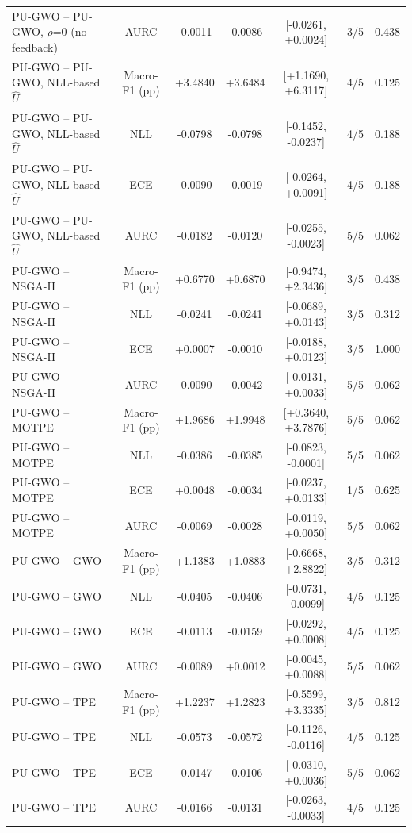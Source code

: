 \begin{table}[t]
\begin{tabular}{lcccccc}
PU-GWO -- PU-GWO, $\rho$=0 (no feedback) & AURC & -0.0011 & -0.0086 & [-0.0261, +0.0024] & 3/5 & 0.438 \\
PU-GWO -- PU-GWO, NLL-based $\hat{U}$ & Macro-F1 (pp) & +3.4840 & +3.6484 & [+1.1690, +6.3117] & 4/5 & 0.125 \\
PU-GWO -- PU-GWO, NLL-based $\hat{U}$ & NLL & -0.0798 & -0.0798 & [-0.1452, -0.0237] & 4/5 & 0.188 \\
PU-GWO -- PU-GWO, NLL-based $\hat{U}$ & ECE & -0.0090 & -0.0019 & [-0.0264, +0.0091] & 4/5 & 0.188 \\
PU-GWO -- PU-GWO, NLL-based $\hat{U}$ & AURC & -0.0182 & -0.0120 & [-0.0255, -0.0023] & 5/5 & 0.062 \\
PU-GWO -- NSGA-II & Macro-F1 (pp) & +0.6770 & +0.6870 & [-0.9474, +2.3436] & 3/5 & 0.438 \\
PU-GWO -- NSGA-II & NLL & -0.0241 & -0.0241 & [-0.0689, +0.0143] & 3/5 & 0.312 \\
PU-GWO -- NSGA-II & ECE & +0.0007 & -0.0010 & [-0.0188, +0.0123] & 3/5 & 1.000 \\
PU-GWO -- NSGA-II & AURC & -0.0090 & -0.0042 & [-0.0131, +0.0033] & 5/5 & 0.062 \\
PU-GWO -- MOTPE & Macro-F1 (pp) & +1.9686 & +1.9948 & [+0.3640, +3.7876] & 5/5 & 0.062 \\
PU-GWO -- MOTPE & NLL & -0.0386 & -0.0385 & [-0.0823, -0.0001] & 5/5 & 0.062 \\
PU-GWO -- MOTPE & ECE & +0.0048 & -0.0034 & [-0.0237, +0.0133] & 1/5 & 0.625 \\
PU-GWO -- MOTPE & AURC & -0.0069 & -0.0028 & [-0.0119, +0.0050] & 5/5 & 0.062 \\
PU-GWO -- GWO & Macro-F1 (pp) & +1.1383 & +1.0883 & [-0.6668, +2.8822] & 3/5 & 0.312 \\
PU-GWO -- GWO & NLL & -0.0405 & -0.0406 & [-0.0731, -0.0099] & 4/5 & 0.125 \\
PU-GWO -- GWO & ECE & -0.0113 & -0.0159 & [-0.0292, +0.0008] & 4/5 & 0.125 \\
PU-GWO -- GWO & AURC & -0.0089 & +0.0012 & [-0.0045, +0.0088] & 5/5 & 0.062 \\
PU-GWO -- TPE & Macro-F1 (pp) & +1.2237 & +1.2823 & [-0.5599, +3.3335] & 3/5 & 0.812 \\
PU-GWO -- TPE & NLL & -0.0573 & -0.0572 & [-0.1126, -0.0116] & 4/5 & 0.125 \\
PU-GWO -- TPE & ECE & -0.0147 & -0.0106 & [-0.0310, +0.0036] & 5/5 & 0.062 \\
PU-GWO -- TPE & AURC & -0.0166 & -0.0131 & [-0.0263, -0.0033] & 4/5 & 0.125 \\

\end{tabular}
\end{table}
